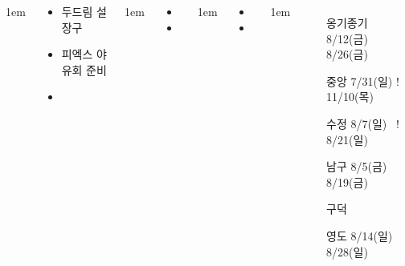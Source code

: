 \documentclass[	20pt, 
							a1paper, 
							portrait, %
							margin=0mm, %
							innermargin=10mm,  		%
							blockverticalspace=4mm, %
							colspace=5mm, 
							subcolspace=0mm
							]{tikzposter}
\begin{document}
\begin{columns}
			{
					\setlength{\leftmargini}{4em}
					\setlength{\labelsep} {1em}
				\begin{LARGE}
					\begin{itemize}
					\item 두드림 설장구
					\item 피엑스 야유회 준비
					\item 
					\end{itemize}
				\end{LARGE}
			}

			{
					\setlength{\leftmargini}{4em}
					\setlength{\labelsep} {1em}
				\begin{LARGE}
					\begin{itemize}
					\item 
					\item 
					\end{itemize}
				\end{LARGE}
			}


			{
					\setlength{\leftmargini}{4em}
					\setlength{\labelsep} {1em}
				\begin{LARGE}
					\begin{itemize}
					\item 
					\item 
					\end{itemize}
				\end{LARGE}
			}





			{
					\setlength{\leftmargini}{6em}
					\setlength{\labelsep} {1em}
					\begin{itemize}
					\item [옹기종기] 8/12(금) ~ 8/26(금)
					\item [중앙] 7/31(일) ! 11/10(목)
					\item [수정] 8/7(일) ~! 8/21(일)
					\item [남구] 8/5(금) ~ 8/19(금)
					\item [구덕] 
					\item [영도] 8/14(일) ~ 8/28(일)


\end{itemize}}
\end{columns}
\end{document}
